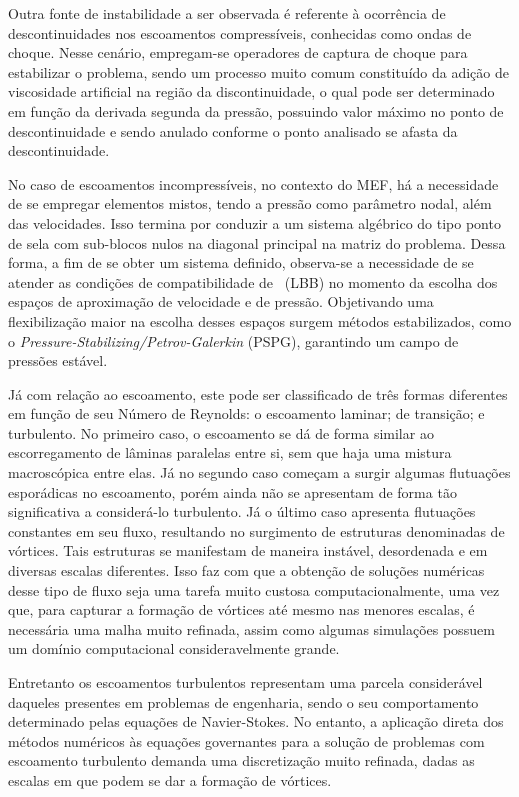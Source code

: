 Outra fonte de instabilidade a ser observada é referente à ocorrência de descontinuidades nos escoamentos compressíveis, conhecidas como ondas de choque. Nesse cenário, empregam-se operadores de captura de choque para estabilizar o problema, sendo um processo muito comum constituído da adição de viscosidade artificial na região da discontinuidade, o qual pode ser determinado em função da derivada segunda da pressão, possuindo valor máximo no ponto de descontinuidade e sendo anulado conforme o ponto analisado se afasta da descontinuidade.

No caso de escoamentos incompressíveis, no contexto do MEF, há a necessidade de se empregar elementos mistos, tendo a pressão como parâmetro nodal, além das velocidades. Isso termina por conduzir a um sistema algébrico do tipo ponto de sela com sub-blocos nulos na diagonal principal na matriz do problema. Dessa forma, a fim de se obter um sistema definido, observa-se a necessidade de se atender as condições de compatibilidade de \LBB\ (LBB) no momento da escolha dos espaços de aproximação de velocidade e de pressão. Objetivando uma flexibilização maior na escolha desses espaços surgem métodos estabilizados, como o \textit{Pressure-Stabilizing/Petrov-Galerkin} (PSPG), garantindo um campo de pressões estável.


Já com relação ao escoamento, este pode ser classificado de três formas diferentes em função de seu Número de Reynolds: o escoamento laminar; de transição; e turbulento. No primeiro caso, o escoamento se dá de forma similar ao escorregamento de lâminas paralelas entre si, sem que haja uma mistura macroscópica entre elas. Já no segundo caso começam a surgir algumas flutuações esporádicas no escoamento, porém ainda não se apresentam de forma tão significativa a considerá-lo turbulento. Já o último caso apresenta flutuações constantes em seu fluxo, resultando no surgimento de estruturas denominadas de vórtices. Tais estruturas se manifestam de maneira instável, desordenada e em diversas escalas diferentes. Isso faz com que a obtenção de soluções numéricas desse tipo de fluxo seja uma tarefa muito custosa computacionalmente, uma vez que, para capturar a formação de vórtices até mesmo nas menores escalas, é necessária uma malha muito refinada, assim como algumas simulações possuem um domínio computacional consideravelmente grande.

Entretanto os escoamentos turbulentos representam uma parcela considerável daqueles presentes em problemas de engenharia, sendo o seu comportamento determinado pelas equações de Navier-Stokes. No entanto, a aplicação direta dos métodos numéricos às equações governantes para a solução de problemas com escoamento turbulento demanda uma discretização muito refinada, dadas as escalas em que podem se dar a formação de vórtices.

